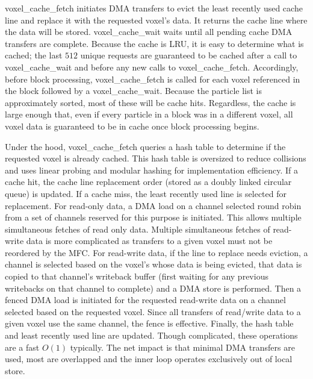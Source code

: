 \documentclass[letter,10pt]{article}
\begin{document}
voxel\_cache\_fetch initiates DMA transfers to evict the least
recently used cache line and replace it with the requested voxel's
data.  It returns the cache line where the data will be stored.
voxel\_cache\_wait waits until all pending cache DMA transfers are
complete.  Because the cache is LRU, it is easy to determine what is
cached; the last $512$ unique requests are guaranteed to be cached
after a call to voxel\_cache\_wait and before any new calls to
voxel\_cache\_fetch.  Accordingly, before block processing,
voxel\_cache\_fetch is called for each voxel referenced in the block
followed by a voxel\_cache\_wait.  Because the particle list is
approximately sorted, most of these will be cache hits.  Regardless,
the cache is large enough that, even if every particle in a block was
in a different voxel, all voxel data is guaranteed to be in cache once
block processing begins.

Under the hood, voxel\_cache\_fetch queries a hash table to determine
if the requested voxel is already cached.  This hash table is
oversized to reduce collisions and uses linear probing and modular
hashing for implementation efficiency.  If a cache hit, the cache line
replacement order (stored as a doubly linked circular queue) is
updated.  If a cache miss, the least recently used line is selected
for replacement.  For read-only data, a DMA load on a channel selected
round robin from a set of channels reserved for this purpose is
initiated.  This allows multiple simultaneous fetches of read only
data.  Multiple simultaneous fetches of read-write data is more
complicated as transfers to a given voxel must not be reordered by the
MFC.  For read-write data, if the line to replace needs eviction, a
channel is selected based on the voxel's whose data is being evicted,
that data is copied to that channel's writeback buffer (first waiting
for any previous writebacks on that channel to complete) and a DMA
store is performed.  Then a fenced DMA load is initiated for the
requested read-write data on a channel selected based on the requested
voxel.  Since all transfers of read/write data to a given voxel use
the same channel, the fence is effective.  Finally, the hash table and
least recently used line are updated.  Though complicated, these
operations are a fast $O(1)$ typically.  The net impact is that minimal 
DMA transfers are used, most are overlapped and the inner
loop operates exclusively out of local store.

\end{document}
